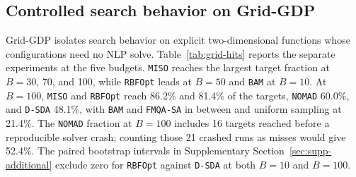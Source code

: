 \documentclass{article}
\begin{document}
\subsection{Controlled search behavior on Grid-GDP}
\label{sec:grid-search-results}
Grid-GDP isolates search behavior on explicit two-dimensional functions whose configurations need no NLP solve.
Table~\ref{tab:grid-hits} reports the separate experiments at the five budgets.
\texttt{MISO} reaches the largest target fraction at \(B=30\), 70, and 100, while \texttt{RBFOpt} leads at \(B=50\) and \texttt{BAM} at \(B=10\).
At \(B=100\), \texttt{MISO} and \texttt{RBFOpt} reach 86.2\% and 81.4\% of the targets, \texttt{NOMAD} 60.0\%, and \texttt{D-SDA} 48.1\%, with \texttt{BAM} and \texttt{FMQA-SA} in between and uniform sampling at 21.4\%.
The \texttt{NOMAD} fraction at \(B=100\) includes 16 targets reached before a reproducible solver crash; counting those 21 crashed runs as misses would give 52.4\%.
The paired bootstrap intervals in Supplementary Section~\ref{sec:supp-additional} exclude zero for \texttt{RBFOpt} against \texttt{D-SDA} at both \(B=10\) and \(B=100\).
\end{document}

